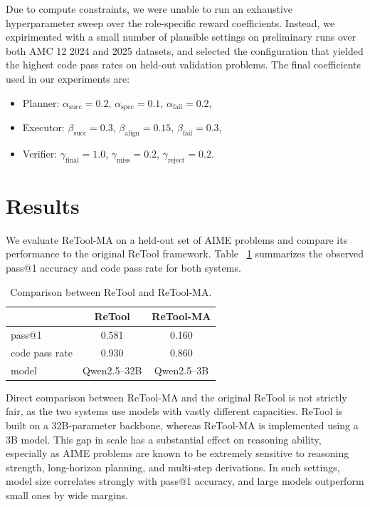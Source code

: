 \documentclass{article}
\begin{document}
Due to compute constraints, we were unable to run an exhaustive hyperparameter sweep
over the role-specific reward coefficients. Instead, we expirimented with a small number of
plausible settings on preliminary runs over both AMC 12 2024 and 2025 datasets, and selected
the configuration that yielded the highest code pass rates on held-out validation problems.
The final coefficients used in our experiments are:
\begin{itemize}
  \item Planner: $\alpha_{\mathrm{succ}} = 0.2$, 
    $\alpha_{\mathrm{spec}} = 0.1$, $\alpha_{\mathrm{fail}} = 0.2$,
  \item Executor: $\beta_{\mathrm{succ}} = 0.3$, 
    $\beta_{\mathrm{align}} = 0.15$, $\beta_{\mathrm{fail}} = 0.3$,
  \item Verifier: $\gamma_{\mathrm{final}} = 1.0$, 
    $\gamma_{\mathrm{miss}} = 0.2$, $\gamma_{\mathrm{reject}} = 0.2$.
\end{itemize}

\section{Results}

We evaluate ReTool-MA on a held-out set of AIME problems and compare its
performance to the original ReTool framework. Table ~\ref{tab:ma_results} 
summarizes the observed pass@1 accuracy and code pass rate for both systems.

\begin{table}[htbp]
\centering
\caption{Comparison between ReTool and ReTool-MA.}
\label{tab:ma_results}
\begin{tabular}{lcc}
\toprule
{} & \textbf{ReTool} & \textbf{ReTool-MA} \\
\midrule
pass@1                & 0.581 & 0.160 \\
code pass rate        & 0.930 & 0.860 \\
model                 & Qwen2.5--32B & Qwen2.5--3B \\
\bottomrule
\end{tabular}
\end{table}

Direct comparison between ReTool-MA and the original ReTool is not strictly 
fair, as the two systems use models with vastly different capacities. ReTool 
is built on a 32B-parameter backbone, whereas ReTool-MA is implemented using 
a 3B model. This gap in scale has a substantial effect on reasoning ability, 
especially as AIME problems are known to be extremely sensitive to reasoning
strength, long-horizon planning, and multi-step derivations. In such settings, 
model size correlates strongly with pass@1 accuracy, and large models outperform 
small ones by wide margins.
\end{document}
